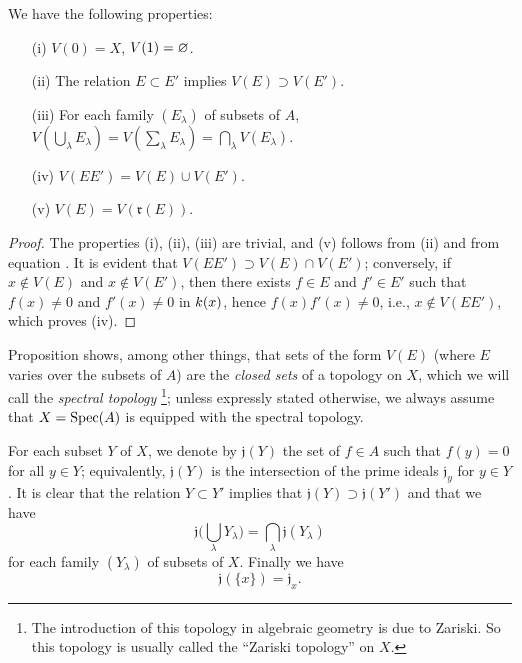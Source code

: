 \begin{proposition}[1.1.2]
\label{I.1.1.2}
We have the following properties:
\begin{enumerate}
  \item[{\rm(i)}] $V(0)=X$, $V(1)=\varnothing$.
  \item[{\rm(ii)}] The relation $E\subset E'$ implies $V(E)\supset V(E')$.
  \item[{\rm(iii)}] For each family $(E_\lambda)$ of subsets of $A$, $V(\bigcup_\lambda E_\lambda)=V(\sum_\lambda E_\lambda)=\bigcap_\lambda V(E_\lambda)$.
  \item[{\rm(iv)}] $V(EE')=V(E)\cup V(E')$.
  \item[{\rm(v)}] $V(E)=V(\mathfrak{r}(E))$.
\end{enumerate}
\end{proposition}

\begin{proof}
The properties (i), (ii), (iii) are trivial, and (v) follows from (ii) and from equation .
It is evident that $V(EE')\supset V(E)\cap V(E')$;
conversely, if $x\not\in V(E)$ and $x\not\in V(E')$, then there exists $f\in E$ and $f'\in E'$ such that $f(x)\neq 0$ and $f'(x)\neq 0$ in $k(x)$, hence $f(x)f'(x)\neq 0$, i.e., $x\not\in V(EE')$, which proves (iv).
\end{proof}

Proposition  shows, among other things, that sets of the form $V(E)$ (where $E$ varies over the subsets of $A$) are the \emph{closed sets} of a topology on $X$, which we will call the \emph{spectral topology}
\footnote{The introduction of this topology in algebraic geometry is due to Zariski.
So this topology is usually called the ``Zariski topology'' on $X$.};
unless expressly stated otherwise, we always assume that $X=\operatorname{Spec}(A)$ is equipped with the spectral topology.

\begin{env}[1.1.3]
\label{I.1.1.3}
For each subset $Y$ of $X$, we denote by $\mathfrak{j}(Y)$ the set of $f\in A$ such that $f(y)=0$ for all $y\in Y$;
equivalently, $\mathfrak{j}(Y)$ is the intersection of the prime ideals $\mathfrak{j}_y$ for $y\in Y$.
It is clear that the relation $Y\subset Y'$ implies that $\mathfrak{j}(Y)\supset\mathfrak{j}(Y')$ and that we have
\[
  \mathfrak{j}\bigg(\bigcup_\lambda Y_\lambda\bigg)=\bigcap_\lambda\mathfrak{j}(Y_\lambda)
  \tag{1.1.3.1}
\]
for each family $(Y_\lambda)$ of subsets of $X$.
Finally we have
\[
  \mathfrak{j}(\{x\})=\mathfrak{j}_x.
  \tag{1.1.3.2}
\]
\end{env}

